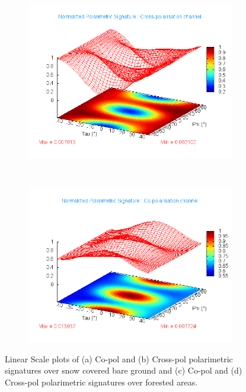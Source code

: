 \begin{figure}
\begin{subfigure}[t]{0.45\columnwidth}
\includegraphics[width=\columnwidth]{Figures/SnowCover2018/Sig/CopolSignature_forest_675_1125}
\caption{}
\end{subfigure}
~
\begin{subfigure}[t]{0.45\columnwidth}
\includegraphics[width=\columnwidth]{Figures/SnowCover2018/Sig/XpolSignature_forest_675_1125}
\caption{}
\end{subfigure}
\caption{Linear Scale plots of (a) Co-pol and (b) Cross-pol polarimetric signatures over snow covered bare ground and (c) Co-pol and (d) Cross-pol polarimetric signatures over forested areas.}
\label{fig:signatureanal}
\end{figure}



